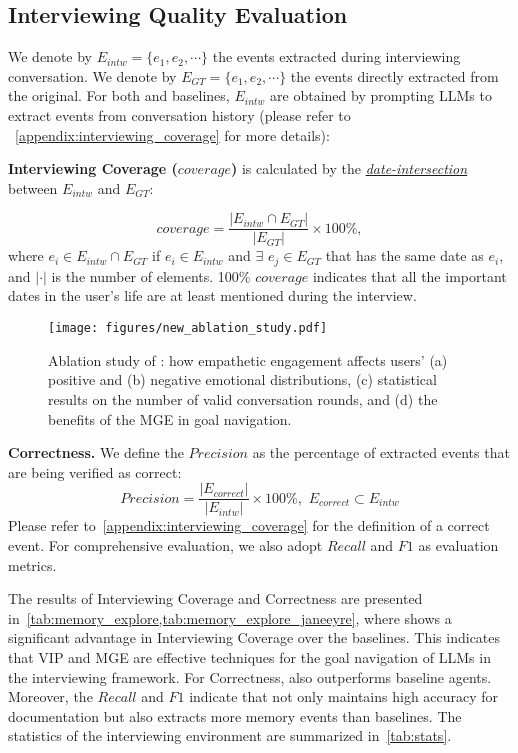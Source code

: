 \subsection{Interviewing Quality Evaluation}\label{section:interviewing_eval}
We denote by $E_{intw}=\{e_1, e_2, \cdots\}$ the events extracted during interviewing conversation. 
We denote by $E_{GT}=\{e_1, e_2, \cdots\}$ the events directly extracted from the original. For both \methodname and baselines, $E_{intw}$ are obtained by prompting LLMs to extract events from conversation history (please refer to ~\cref{appendix:interviewing_coverage} for more details):

\noindent\textbf{Interviewing Coverage ($coverage$)} is calculated by the \underline{\textit{date-intersection}} between $E_{intw}$ and $E_{GT}$:

    \small
    $$
    coverage = \frac{|E_{intw} \cap E_{GT}|}{|E_{GT}|} \times 100\%,
    $$
    \normalsize
    where $e_i \in E_{intw} \cap E_{GT} $ if $e_i \in E_{intw}$ and $\exists \,\, e_j \in E_{GT}$ that has the same date as $e_i$, and $|\cdot|$ is the number of elements. 100\% $coverage$ indicates that all the important dates in the user's life are at least mentioned during the interview.
    
\begin{figure*}[t]
    \centering
    \texttt{[image: figures/new\_ablation\_study.pdf]}
    \vspace{-3mm}
    \caption{Ablation study of \methodname: how empathetic engagement affects users' (a) positive and (b) negative emotional distributions, (c) statistical results on the number of valid conversation rounds, and (d) the benefits of the MGE in goal navigation.}
    \label{fig:ablation_study}
    \vspace{-5mm}
\end{figure*}

\noindent\textbf{Correctness.} We define the $Precision$ as the percentage of extracted events that are being verified as correct:
    \small
    $$
    Precision = \frac{|E_{correct}|}{|E_{intw}|} \times 100\%, \,\, E_{correct} \subset E_{intw} 
    $$
    \normalsize
    Please refer to~\cref{appendix:interviewing_coverage} for the definition of a correct event. 
    For comprehensive evaluation, we also adopt $Recall$ and $F1$ as evaluation metrics.


 The results of Interviewing Coverage and Correctness are presented in~\cref{tab:memory_explore,tab:memory_explore_janeeyre}, where \methodname shows a significant advantage in Interviewing Coverage over the baselines. This indicates that VIP and MGE are effective techniques for the goal navigation of LLMs in the interviewing framework. For Correctness, \methodname also outperforms baseline agents. Moreover, the $Recall$ and $F1$ indicate that \methodname not only maintains high accuracy for documentation but also extracts more memory events than baselines. The statistics of the interviewing environment are summarized in~\cref{tab:stats}. 

